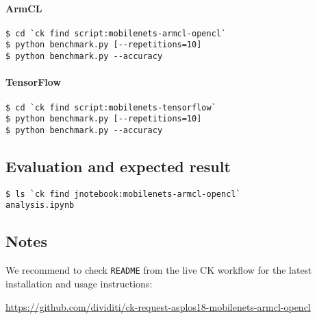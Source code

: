\paragraph{ArmCL}

\begin{verbatim}
$ cd `ck find script:mobilenets-armcl-opencl`
$ python benchmark.py [--repetitions=10]
$ python benchmark.py --accuracy
\end{verbatim}

\paragraph{TensorFlow}

\begin{verbatim}
$ cd `ck find script:mobilenets-tensorflow`
$ python benchmark.py [--repetitions=10]
$ python benchmark.py --accuracy
\end{verbatim}


\subsection{Evaluation and expected result}

\begin{verbatim}
$ ls `ck find jnotebook:mobilenets-armcl-opencl`
analysis.ipynb
\end{verbatim}

\subsection{Notes}

We recommend to check {\tt README} from the live CK workflow for the latest
installation and usage instructions: 

\url{https://github.com/dividiti/ck-request-asplos18-mobilenets-armcl-opencl}

